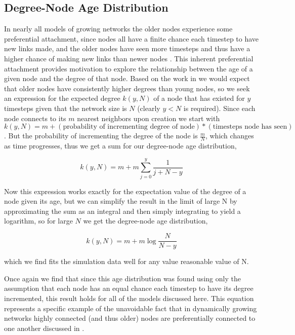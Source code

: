 \documentclass[aps,pre,reprint,superscriptaddress,amsmath,amssymb]{revtex4-1}
\begin{document}

\subsection{Degree-Node Age Distribution}
In nearly all models of growing networks the older nodes experience some preferential attachment, since nodes all have a finite chance each timestep to have new links made, and the older nodes have seen more timesteps and thus have a higher chance of making new links than newer nodes \cite{reallyrandom}.
This inherent preferential attachment provides motivation to explore the relationship between the age of a given node and the degree of that node. 
Based on the work in \cite{reallyrandom} we would expect that older nodes have consistently higher degrees than young nodes, so we seek an expression for the expected degree $k(y,N)$ of a node that has existed for $y$ timesteps given that the network size is $N$ (clearly $y < N$ is required).
Since each node connects to its $m$ nearest neighbors upon creation we start with $k(y,N) = m + (\text{probability of incrementing degree of node})*(\text{timesteps node has seen})$.
But the probability of incrementing the degree of the node is $\frac{m}{N}$, which changes as time progresses, thus we get a sum for our degree-node age distribution,

\[k(y,N) = m + m\sum_{j=0}^{y} \frac{1}{j+N-y}\]

Now this expression works exactly for the expectation value of the degree of a node given its age, but we can simplify the result in the limit of large N by approximating the sum as an integral and then simply integrating to yield a logarithm, so for large $N$ we get the degree-node age distribution,

\[k(y,N) = m + m\log{\frac{N}{N-y}}\]

which we find fits the simulation data well for any value reasonable value of N.
 
Once again we find that since this age distribution was found using only the assumption that each node has an equal chance each timestep to have its degree incremented, this result holds for all of the models discussed here.
This equation represents a specific example of the unavoidable fact that in dynamically growing networks highly connected (and thus older) nodes are preferentially connected to one another discussed in \cite{reallyrandom}.
\end{document}
